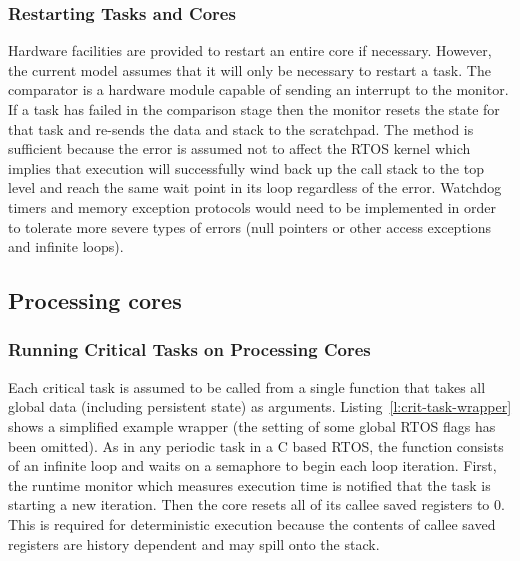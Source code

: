 \subsubsection{Restarting Tasks and Cores}

	Hardware facilities are provided to restart an entire core if necessary. 
	However, the current model assumes that it will only be necessary to restart a task.
	The comparator is a hardware module capable of sending an interrupt to the monitor. 
	If a task has failed in the comparison stage then the monitor resets the state for that task and re-sends the data and stack to the scratchpad.
	The method is sufficient because the error is assumed not to affect the RTOS kernel which implies that execution will successfully wind back up the call stack to the top level and reach the same wait point in its loop regardless of the error.
	Watchdog timers and memory exception protocols would need to be implemented in order to tolerate more severe types of errors (null pointers or other access exceptions and infinite loops).



\subsection{Processing cores}
\label{s:proc-cores}
\subsubsection{Running Critical Tasks on Processing Cores}

\label{s:pcores}
	Each critical task is assumed to be called from a single function that takes all global data (including persistent state) as arguments. 
	Listing~\ref{l:crit-task-wrapper} shows a simplified example wrapper (the setting of some global RTOS flags has been omitted). 
	As in any periodic task in a C based RTOS, the function consists of an infinite loop and waits on a semaphore to begin each loop iteration. 
	First, the runtime monitor which measures execution time is notified that the task is starting a new iteration. 
	Then the core resets all of its callee saved registers to 0. 
	This is required for deterministic execution because the contents of callee saved registers are history dependent and may spill onto the stack. 

